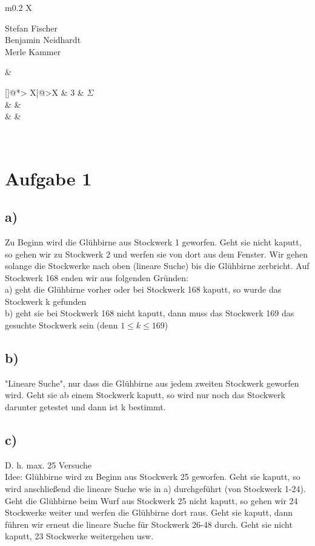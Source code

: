 \documentclass[a4paper]{scrartcl}
\makeatletter
\newcounter{punktelistectr}
\newcounter{punkte}
\newcommand{\punkteliste}[2]{%
  \setcounter{punkte}{#2}%
  \addtocounter{punkte}{-#1}%
  \stepcounter{punkte}%
  \begin{center}%
  \begin{tabularx}{\linewidth}[]{@{}*{\thepunkte}{>{\centering\arraybackslash} X|}@{}>{\centering\arraybackslash}X}
      \forloop{punktelistectr}{#1}{\value{punktelistectr} < #2 } %
      {%
        \thepunktelistectr & 
      } 
      #2 &  $\Sigma$ \\
      \hline
      \forloop{punktelistectr}{#1}{\value{punktelistectr} < #2 } %
      {%
        &
      } &\\ 
      \forloop{punktelistectr}{#1}{\value{punktelistectr} < #2 } %
      {%
        &
      } &\\ 
    \end{tabularx}
  \end{center}
}
\makeatother
\begin{document}
\begin{tabularx}{\linewidth}{m{0.2 \linewidth}X}
\begin{minipage}{\linewidth}%
%
%
Stefan Fischer\\ 
Benjamin Neidhardt\\ 
Merle Kammer 
\end{minipage} & \begin{minipage}{\linewidth}%
%
%
%
\punkteliste{1}{3} %
%
\end{minipage}\\
\end{tabularx}



%



\section*{Aufgabe 1}
\subsection*{a)}
Zu Beginn wird die Glühbirne aus Stockwerk 1 geworfen. Geht sie nicht kaputt, 
so gehen wir zu Stockwerk 2 und werfen sie von dort aus dem Fenster. Wir gehen solange die Stockwerke nach oben (lineare Suche) bis die Glühbirne zerbricht. Auf Stockwerk 168 enden wir aus folgenden Gründen:
\\

 a) geht die Glühbirne vorher oder bei Stockwerk 168 kaputt, so wurde das Stockwerk k gefunden
 \\
 
 b) geht sie bei Stockwerk 168 nicht kaputt, dann muss das Stockwerk 169 das gesuchte Stockwerk sein         (denn $1 \leq k \leq 169 $)
\subsection*{b)}
"Lineare Suche", nur dass die Glühbirne aus jedem zweiten Stockwerk geworfen wird. Geht sie ab einem Stockwerk kaputt, so wird nur noch das Stockwerk darunter getestet und dann ist k bestimmt.
\subsection*{c)}
D. h. max. 25 Versuche
\\
Idee: Glühbirne wird zu Beginn aus Stockwerk 25 geworfen. Geht sie kaputt, so wird anschließend die lineare Suche wie in a) durchgeführt (von Stockwerk 1-24). Geht die Glühbirne beim Wurf aus Stockwerk 25 nicht kaputt, so gehen wir 24 Stockwerke weiter und werfen die Glühbirne dort raus. Geht sie kaputt, dann führen wir erneut die lineare Suche für Stockwerk 26-48 durch. Geht sie nicht kaputt, 23 Stockwerke weitergehen usw.
\\
\end{document}
